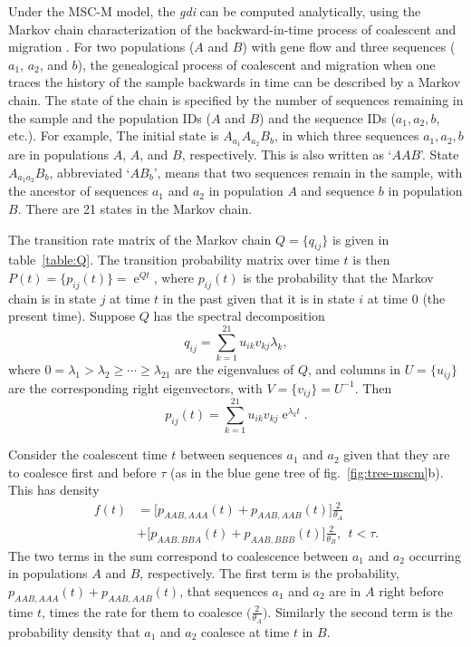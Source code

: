 \documentclass[A4]{article1}
\DeclareMathOperator{\e}{\mathrm{e}}
\begin{document}
Under the MSC-M model, the \textit{gdi} can be computed analytically, using the Markov
chain characterization of the backward-in-time process of coalescent and migration
\citep{Leache2019}.  For two populations ($A$ and $B$) with gene flow and three
sequences ($a_1$, $a_2$, and $b$), the genealogical process of coalescent and migration
when one traces the history of the sample backwards in time can be described by a Markov
chain.  The state of the chain is specified by the number of sequences remaining in the
sample and the population IDs ($A$ and $B$) and the sequence IDs ($a_1, a_2, b$, etc.). 
For example, The initial state is $A_{a_1}A_{a_2}B_b$, in which three sequences $a_1,
a_2, b$ are in populations $A$, $A$, and $B$, respectively.  This is also written as
`$AAB$'.  State $A_{a_1a_2}B_b$, abbreviated `$AB_b$', means that two sequences remain
in the sample, with the ancestor of sequences $a_1$ and $a_2$ in population $A$ and
sequence $b$ in population $B$.  There are 21 states in the Markov chain.

The transition rate matrix of the Markov chain $Q = \{q_{ij}\}$ is given in
table~\ref{table:Q}. The transition probability matrix over time $t$ is then $P(t) =
\{p_{ij}(t)\} = \e^{Qt}$, where $p_{ij}(t)$ is the probability that the Markov
chain is in state $j$ at time $t$ in the past given that it is in state $i$ at time 0 (the
present time).  Suppose $Q$ has the spectral decomposition
\begin{equation} 
    q_{ij} = \sum_{k=1}^{21} u_{ik} v_{kj} \lambda_k ,
\end{equation} 
where $0 = \lambda_1 > \lambda_2 \ge \cdots \ge \lambda_{21}$ are the eigenvalues of
$Q$, and columns in $U = \{u_{ij}\}$ are the corresponding right eigenvectors, with $V =
\{v_{ij}\} = U^{-1}$.  Then
\begin{equation} \label{eq:pij}
    p_{ij}(t) = \sum_{k=1}^{21}  u_{ik} v_{kj} \e^{\lambda_k t}.
\end{equation}

Consider the coalescent time $t$ between sequences $a_1$ and $a_2$ given that they are to
coalesce first and before $\tau$ (as in the blue gene tree of fig.~\ref{fig:tree-mscm}b).
This has density
\begin{equation} \label{eq:ft} 
\begin{aligned}
  f(t) &= \bigl[ p_{AAB, AAA}(t) + p_{AAB, AAB}(t) \bigr] \tfrac{2}{\theta_A} \\
       &+ \bigl[ p_{AAB, BBA}(t) + p_{AAB, BBB}(t) \bigr] \tfrac{2}{\theta_B}, \ \ t < \tau.
\end{aligned}
\end{equation} 
The two terms in the sum correspond to coalescence between $a_1$ and $a_2$ occurring in
populations $A$ and $B$, respectively.  The first term is the probability, $p_{AAB,
   AAA}(t) + p_{AAB, AAB}(t)$, that sequences $a_1$ and $a_2$ are in $A$ right before time
$t$, times the rate for them to coalesce $\bigl( \frac{2}{\theta_A} \bigr)$. Similarly
the second term is the probability density that $a_1$ and $a_2$ coalesce at time $t$ in
$B$.
\end{document}
